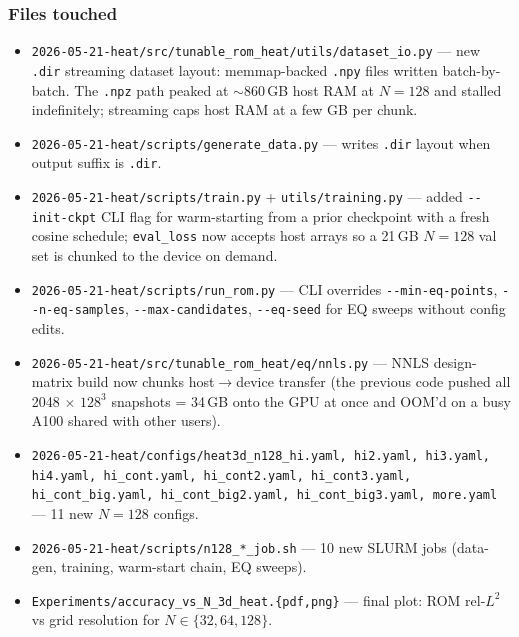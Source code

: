 \subsubsection*{Files touched}
\begin{itemize}
  \item \texttt{2026-05-21-heat/src/tunable\_rom\_heat/utils/dataset\_io.py} --- new \texttt{.dir} streaming dataset layout: memmap-backed \texttt{.npy} files written batch-by-batch. The \texttt{.npz} path peaked at ${\sim}860$\,GB host RAM at $N=128$ and stalled indefinitely; streaming caps host RAM at a few GB per chunk.
  \item \texttt{2026-05-21-heat/scripts/generate\_data.py} --- writes \texttt{.dir} layout when output suffix is \texttt{.dir}.
  \item \texttt{2026-05-21-heat/scripts/train.py} + \texttt{utils/training.py} --- added \texttt{-{}-init-ckpt} CLI flag for warm-starting from a prior checkpoint with a fresh cosine schedule; \texttt{eval\_loss} now accepts host arrays so a 21\,GB $N=128$ val set is chunked to the device on demand.
  \item \texttt{2026-05-21-heat/scripts/run\_rom.py} --- CLI overrides \texttt{-{}-min-eq-points}, \texttt{-{}-n-eq-samples}, \texttt{-{}-max-candidates}, \texttt{-{}-eq-seed} for EQ sweeps without config edits.
  \item \texttt{2026-05-21-heat/src/tunable\_rom\_heat/eq/nnls.py} --- NNLS design-matrix build now chunks host$\to$device transfer (the previous code pushed all 2048 $\times$ $128^3$ snapshots = 34\,GB onto the GPU at once and OOM'd on a busy A100 shared with other users).
  \item \texttt{2026-05-21-heat/configs/heat3d\_n128\_hi.yaml, hi2.yaml, hi3.yaml, hi4.yaml, hi\_cont.yaml, hi\_cont2.yaml, hi\_cont3.yaml, hi\_cont\_big.yaml, hi\_cont\_big2.yaml, hi\_cont\_big3.yaml, more.yaml} --- 11 new $N=128$ configs.
  \item \texttt{2026-05-21-heat/scripts/n128\_*\_job.sh} --- 10 new SLURM jobs (data-gen, training, warm-start chain, EQ sweeps).
  \item \texttt{Experiments/accuracy\_vs\_N\_3d\_heat.\{pdf,png\}} --- final plot: ROM rel-$L^2$ vs grid resolution for $N \in \{32, 64, 128\}$.
\end{itemize}

